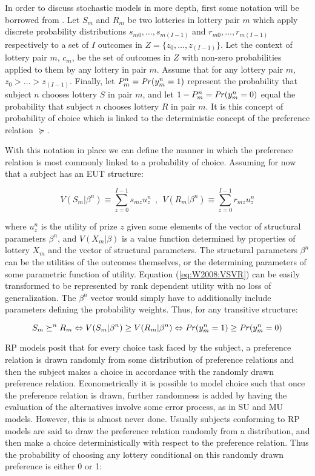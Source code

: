 \documentclass[../main.tex]{subfiles}
\begin{document}
In order to discuss stochastic models in more depth, first some notation will be borrowed from \textcite{Wilcox2008}.
Let $S_m$ and $R_m$ be two lotteries in lottery pair $m$ which apply discrete probability distributions $s_{m0} , \ldots , s_{m(I-1)}$ and $r_{m0} , \ldots , r_{m(I-1)}$ respectively to a set of $I$ outcomes in $Z = \lbrace z_0 , \ldots , z_{(I-1)} \rbrace$.
Let the context of lottery pair $m$, $c_m$, be the set of outcomes in $Z$ with non-zero probabilities applied to them by any lottery in pair $m$.
Assume that for any lottery pair $m$, $z_0 > \ldots > z_{(I-1)}$.
Finally, let $P_m^n = {\mathit{Pr}}(y_m^n = 1) $ represent the probability that subject $n$ chooses lottery $S$ in pair $m$, and let $1-P_m^n = {\mathit{Pr}}(y_m^n = 0)$ equal the probability that subject $n$ chooses lottery $R$ in pair $m$.
It is this concept of probability of choice which is linked to the deterministic concept of the preference relation $\succeq$.

With this notation in place we can define the manner in which the preference relation  is most commonly linked to a probability of choice.
Assuming for now that a subject has an EUT structure: 

\begin{equation}
	\label{eq:W2008:VSVR}
	V( S_m | \beta^n )  \equiv \sum_{z=0}^{I-1} s_{mz} u^n_z   ~~,~~  V( R_m | \beta^n ) \equiv \sum_{z=0}^{I-1} r_{mz} u^n_z
\end{equation}

\noindent where $u_z^n$ is the utility of prize $z$ given some elements of the vector of structural parameters $\beta^n$, and $V(X_m|\beta)$ is a value function determined by properties of lottery $X_m$ and the vector of structural parameters.
The structural parameters $\beta^n$ can be the utilities of the outcomes themselves, or the determining parameters of some parametric function of utility.
Equation (\ref{eq:W2008:VSVR}) can be easily transformed to be represented by rank dependent utility with no loss of generalization.
The $\beta^n$ vector would simply have to additionally include parameters defining the probability weights.
Thus, for any transitive structure:

\begin{equation}
	S_m \succeq^n R_m \Leftrightarrow  V( S_m | \beta^n ) \geq V( R_m | \beta^n ) \Leftrightarrow {\ensuremath{\mathit{Pr}}}( y^n_m=1 ) \geq {\ensuremath{\mathit{Pr}}}( y^n_m=0 )
\end{equation}

RP models posit that for every choice task faced by the subject, a preference relation is drawn randomly from some distribution of preference relations and then the subject makes a choice in accordance with the randomly drawn preference relation.
Econometrically it is possible to model choice such that once the preference relation is drawn, further randomness is added by having the evaluation of the alternatives involve some error process, as in SU and MU models.
However, this is almost never done.
Usually subjects conforming to RP models are said to draw the preference relation randomly from a distribution, and then make a choice deterministically with respect to the preference relation.
Thus the probability of choosing any lottery conditional on this randomly drawn preference is either 0 or 1:
\end{document}
